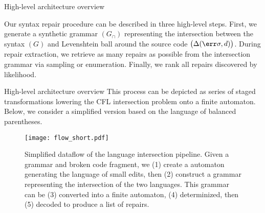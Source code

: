 \documentclass{beamer}
\begin{document}
\begin{frame}[fragile]{High-level architecture overview}
\begin{wrapfigure}{r}{0.4\textwidth}
{
}
\end{wrapfigure}

  Our syntax repair procedure can be described in three high-level steps. First, we generate a synthetic grammar $(G_\cap)$ representing the intersection between the syntax $(G)$ and Levenshtein ball around the source code $\big(\Delta(\err\sigma, d)\big)$. During repair extraction, we retrieve as many repairs as possible from the intersection grammar via sampling or enumeration. Finally, we rank all repairs discovered by likelihood.

\end{frame}


\begin{frame}[fragile]{High-level architecture overview}
This process can be depicted as series of staged transformations lowering the CFL intersection problem onto a finite automaton. Below, we consider a simplified version based on the language of balanced parentheses.

\vspace{0.3cm}
\begin{figure}[H]
\centering
\texttt{[image: flow\_short.pdf]}
\vspace{0.1cm}
\caption{Simplified dataflow of the language intersection pipeline. Given a grammar and broken code fragment, we (1) create a automaton generating the language of small edits, then (2) construct a grammar representing the intersection of the two languages. This grammar can be (3) converted into a finite automaton, (4) determinized, then (5) decoded to produce a list of repairs.}
\label{fig:exampleDFA}
\end{figure}
\end{frame}
\end{document}
